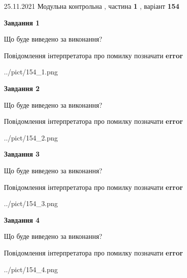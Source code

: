 \documentclass[10pt, ukrainian]{article}
\begin{document}
{25.11.2021 Модульна контрольна , частина \textbf { 1 }, варіант  \No \textbf { 154 }\par}
{
\begin {large}

{\begin {center}\textbf{Завдання 1}\end {center}}\par
Що буде виведено за виконання? \par
Повідомлення інтерпретатора про помилку позначати \textbf{error}

\begin{center}
	{../pict/154_1.png}
\end{center}
\newpage

{\begin {center}\textbf{Завдання 2}\end {center}}\par
Що буде виведено за виконання? \par
Повідомлення інтерпретатора про помилку позначати \textbf{error}

\begin{center}
	{../pict/154_2.png}
\end{center}
\newpage

{\begin {center}\textbf{Завдання 3}\end {center}}\par
Що буде виведено за виконання? \par
Повідомлення інтерпретатора про помилку позначати \textbf{error}

\begin{center}
	{../pict/154_3.png}
\end{center}
\newpage

{\begin {center}\textbf{Завдання 4}\end {center}}\par
Що буде виведено за виконання? \par
Повідомлення інтерпретатора про помилку позначати \textbf{error}

\begin{center}
	{../pict/154_4.png}
\end{center}
\newpage


\end{large}}
\end{document}
